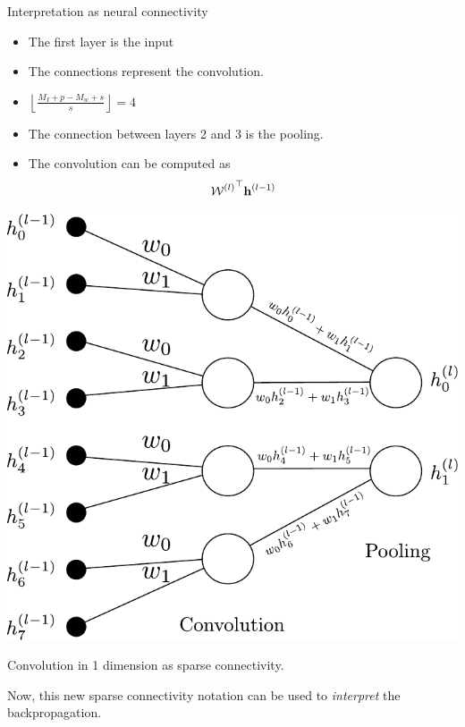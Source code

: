 \documentclass{beamer}
\begin{document}
\begin{frame}{Interpretation as neural connectivity}
\begin{multicols}{2}
\begin{itemize}
\item The first layer is the input
\item The connections  represent the convolution. 
\item $\left\lfloor\frac{M_I+p-M_w+s}{s}\right\rfloor = 4$ 
\item The connection between layers 2 and 3 is the pooling. 
\item The convolution can be computed as $${\mathcal{W}^{(l)}}^\top{\bf h}^{(l-1)}$$
\end{itemize}
\columnbreak
\begin{center}
    \includegraphics[scale=0.4]{Module 4 (CNN)/pics/Conv_sparse_rep.pdf}\\
    \begin{tiny}Convolution in 1 dimension as sparse connectivity.\end{tiny} 
\end{center}
\end{multicols}
Now, this new sparse connectivity notation can be used to \emph{interpret} the backpropagation. 
\end{frame}
\end{document}
